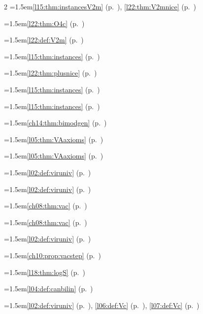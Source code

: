 \begin{multicols}{2}
\hangindent=1.5em\quad \ref{l15:thm:instancesV2m} (p.~\pageref{l15:thm:instancesV2m}), \ref{l22:thm:V2mnice} (p.~\pageref{l22:thm:V2mnice})\par
\hangindent=1.5em\quad \ref{l22:thm:O4c} (p.~\pageref{l22:thm:O4c})\par
\hangindent=1.5em\quad \ref{l22:def:V2m} (p.~\pageref{l22:def:V2m})\par
\hangindent=1.5em\quad \ref{l15:thm:instances} (p.~\pageref{l15:thm:instances})\par
\hangindent=1.5em\quad \ref{l22:thm:plusnice} (p.~\pageref{l22:thm:plusnice})\par
\hangindent=1.5em\quad \ref{l15:thm:instances} (p.~\pageref{l15:thm:instances})\par
\hangindent=1.5em\quad \ref{l15:thm:instances} (p.~\pageref{l15:thm:instances})\par
\hangindent=1.5em\quad \ref{ch14:thm:bimodgen} (p.~\pageref{ch14:thm:bimodgen})\par
\hangindent=1.5em\quad \ref{l05:thm:VAaxioms} (p.~\pageref{l05:thm:VAaxioms})\par
\hangindent=1.5em\quad \ref{l05:thm:VAaxioms} (p.~\pageref{l05:thm:VAaxioms})\par
\hangindent=1.5em\quad \ref{l02:def:viruniv} (p.~\pageref{l02:def:viruniv})\par
\hangindent=1.5em\quad \ref{l02:def:viruniv} (p.~\pageref{l02:def:viruniv})\par
\hangindent=1.5em\quad \ref{ch08:thm:vac} (p.~\pageref{ch08:thm:vac})\par
\hangindent=1.5em\quad \ref{ch08:thm:vac} (p.~\pageref{ch08:thm:vac})\par
\hangindent=1.5em\quad \ref{l02:def:viruniv} (p.~\pageref{l02:def:viruniv})\par
\hangindent=1.5em\quad \ref{ch10:prop:vacstep} (p.~\pageref{ch10:prop:vacstep})\par
\hangindent=1.5em\quad \ref{l18:thm:logS} (p.~\pageref{l18:thm:logS})\par
\hangindent=1.5em\quad \ref{l04:def:canbilin} (p.~\pageref{l04:def:canbilin})\par
\hangindent=1.5em\quad \ref{l02:def:viruniv} (p.~\pageref{l02:def:viruniv}), \ref{l06:def:Vc} (p.~\pageref{l06:def:Vc}), \ref{l07:def:Vc} (p.~\pageref{l07:def:Vc})\par

\end{multicols}
